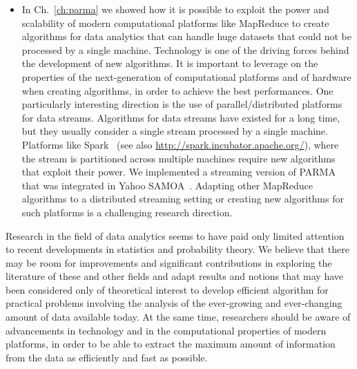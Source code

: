 \begin{itemize}
\item In Ch.~\ref{ch:parma} we showed how it is possible to exploit the
power and scalability of modern computational platforms like MapReduce to create
algorithms for data analytics that can handle huge datasets that could not be
processed by a single machine. Technology is one of the driving forces behind
the development of new algorithms. It is important to leverage on the properties
of the next-generation of computational platforms and of hardware when
creating algorithms, in order to achieve the best performances. One particularly
interesting direction is the use of parallel/distributed platforms for data
streams. Algorithms for data streams have existed for a long time, but they
usually consider a single stream processed by a single machine. Platforms like
Spark~\citep{ZahariaCFSS13} (see also \url{http://spark.incubator.apache.org/}),
where the stream is partitioned across multiple machines require new algorithms
that exploit their power. We implemented a streaming version of PARMA that was
integrated in Yahoo SAMOA~\citep{DFMorales13}. Adapting other MapReduce
algorithms to a distributed streaming setting or creating new algorithms for
such platforms is a challenging research direction.
\end{itemize}


Research in the field of data analytics seems to have paid only limited
attention to recent developments in statistics and probability theory. We
believe that there may be room for improvements and significant contributions in
exploring the literature of these and other fields and adapt results and notions
that may have been considered only of theoretical interest to develop efficient
algorithm for practical problems involving the analysis of the ever-growing and
ever-changing amount of data available today. At the same time, researchers
should be aware of advancements in technology and in the computational
properties of modern platforms, in order to be able to extract the maximum
amount of information from the data as efficiently and fast as possible. 


